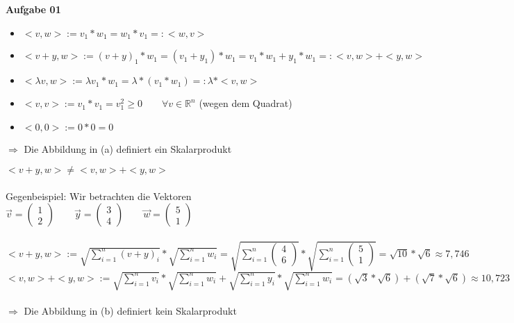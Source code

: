 \documentclass[a4paper,10pt]{article}
\begin{document}
	\parindent0pt
	\textbf{Aufgabe 01}\\
	
	\begin{compactenum} [(a)]
		\item \begin{itemize}
			\item $ <v,w> := v_1 * w_1 = w_1 * v_1 =: <w,v> $
			\item $ <v+y,w> := (v+y)_1 * w_1 = (v_1 + y_1) * w_1 = v_1 * w_1 + y_1* w_1 =: <v,w> + <y,w>$
			\item $ < \lambda v,w> := \lambda v_1 * w_1 = \lambda *(v_1 * w_1) =: \lambda * <v,w> $
			\item $ <v,v> := v_1 * v_1 = v_1^2 \geq 0 \qquad \forall v \in \mathbb{R}^n $ (wegen dem Quadrat)
			\item $ <0,0> := 0*0 = 0 $
		\end{itemize}
		$ \Longrightarrow $ Die Abbildung in (a) definiert ein Skalarprodukt\\
	
		\item $<v+y,w> \neq <v,w> + <y,w> $\\\\
		Gegenbeispiel: Wir betrachten die Vektoren\\
		$ \vec{v} = \begin{pmatrix}
		1 \\ 2
		\end{pmatrix} \qquad
		\vec{y} = \begin{pmatrix}
		3 \\ 4
		\end{pmatrix} \qquad
		\vec{w} = \begin{pmatrix}
		5 \\ 1
		\end{pmatrix}$\\
		\\
		$ <v+y,w> := \sqrt{\sum_{i = 1}^{n} (v+y)_i} * \sqrt{\sum_{i = 1}^{n} w_i} = \sqrt{\sum_{i = 1}^{n} \begin{pmatrix}
			4 \\ 6 \end{pmatrix}} * \sqrt{\sum_{i = 1}^{n} \begin{pmatrix}
			5 \\ 1 \end{pmatrix}} = \sqrt{10} * \sqrt{6} \approx 7,746$ \\
		$ <v,w> + <y,w> := \sqrt{\sum_{i = 1}^{n} v_i} * \sqrt{\sum_{i = 1}^{n} w_i} + \sqrt{\sum_{i = 1}^{n} y_i} * \sqrt{\sum_{i = 1}^{n} w_i} = (\sqrt{3} * \sqrt{6}) + (\sqrt{7} * \sqrt{6}) \approx 10,723 $ \\ \\
		$ \Longrightarrow $ Die Abbildung in (b) definiert kein Skalarprodukt \\
		

\end{compactenum}
\end{document}
